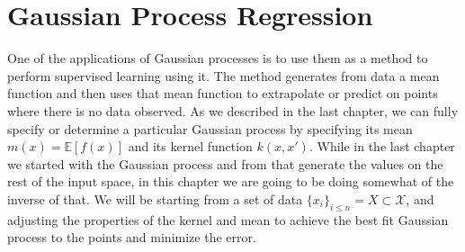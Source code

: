 \chapter{Gaussian Process Regression}

One of the applications of Gaussian processes is to use them as a method to perform supervised learning using it. The method generates from data a mean function and then uses that mean function to extrapolate or predict on points where there is no data observed. As we described in the last chapter, we can fully specify or determine a particular Gaussian process by specifying its mean $m(x) = \mathbb{E}[f(x)]$ and its kernel function $k(x,x')$. While in the last chapter we started with the Gaussian process and from that generate the values on the rest of the input space, in this chapter we are going to be doing somewhat of the inverse of that. We will be starting from a set of data $\{ x_i \}_{i \leq n} = X \subset \mathcal{X}$, and adjusting the properties of the kernel and mean to achieve the best fit Gaussian process to the points and minimize the error. 